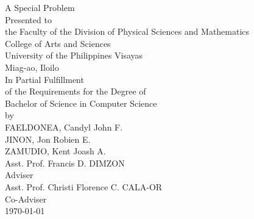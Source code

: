 \begin{titlepage}
\centering


\vspace{0.875cm}
A Special Problem\\
Presented to\\
the Faculty of the Division of Physical Sciences and Mathematics\\
College of Arts and Sciences\\
University of the Philippines Visayas\\
Miag-ao, Iloilo\\
\vspace{0.875cm}
In Partial Fulfillment\\
of the Requirements for the Degree of\\
Bachelor of Science in Computer Science\\
\vspace{1.1cm} %
by\\
\vspace{0.1cm}
FAELDONEA, Candyl John F. \\
JINON, Jon Robien  E.\\
ZAMUDIO, Kent Joash  A.\\
\vspace{0.875cm}
Asst. Prof. Francis D. DIMZON \\
Adviser\\
Asst. Prof. Christi Florence C. CALA-OR \\
Co-Adviser\\
\vspace{0.875cm}
\today
\end{titlepage}

